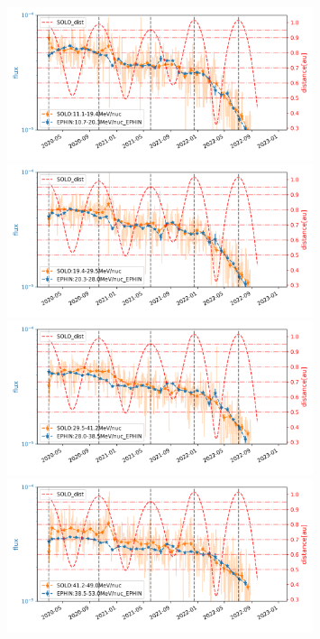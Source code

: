 \begin{figure}
    \centering
    \includegraphics[width = 0.8\textwidth, height = 0.2\textheight]{images/ACR/seperate_mask_1-3/Carrington_SOLO_11.1-19.4MeV_EPHIN_10.7-20.3MeV.png}
    \includegraphics[width = 0.8\textwidth,height = 0.2\textheight]{images/ACR/seperate_mask_1-3/Carrington_SOLO_19.4-29.5MeV_EPHIN_20.3-28.0MeV.png}
    \includegraphics[width = 0.8\textwidth,height = 0.2\textheight]{images/ACR/seperate_mask_1-3/Carrington_SOLO_29.5-41.2MeV_EPHIN_28.0-38.5MeV.png}
    \includegraphics[width = 0.8\textwidth,height = 0.2\textheight]{images/ACR/seperate_mask_1-3/Carrington_SOLO_41.2-49.0MeV_EPHIN_38.5-53.0MeV.png}

\end{figure}
